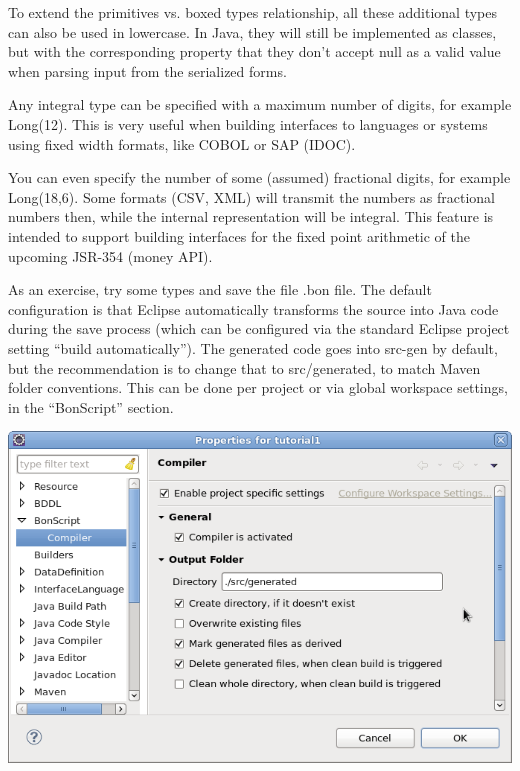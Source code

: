 \documentclass[11pt,a4paper,oneside]{article}
\begin{document}
To extend the primitives vs. boxed types relationship, all these additional types can also be used in lowercase. In Java, they will still be implemented as
classes, but with the corresponding property that they don't accept null as a valid value when parsing input from the serialized forms.

\vspace{2mm}

Any integral type can be specified with a maximum number of digits, for example {\ttfamily Long(12)}. This is very useful when
building interfaces to languages or systems using fixed width formats, like COBOL or SAP (IDOC).

You can even specify the number of some (assumed) fractional digits, for example {\ttfamily Long(18,6)}. Some formats (CSV, XML)
will transmit the numbers as fractional numbers then, while the internal representation will be integral. This feature is
intended to support building interfaces for the fixed point arithmetic of the upcoming JSR-354 (money API).


\vspace{2mm}

As an exercise, try some types and save the file {\ttfamily .bon} file. The default configuration is that Eclipse automatically transforms the source into
Java code during the save process (which can be configured via the standard Eclipse project setting ``build automatically''). The generated code goes into
{\ttfamily src-gen} by default, but the recommendation is to change that to {\ttfamily src/generated}, to match Maven folder conventions.
This can be done per project or via global workspace settings, in the ``BonScript'' section.

\vspace{2mm}
\begin{center}
\includegraphics[scale=0.45]{images/tut1-003.png}
\end{center}
\end{document}
